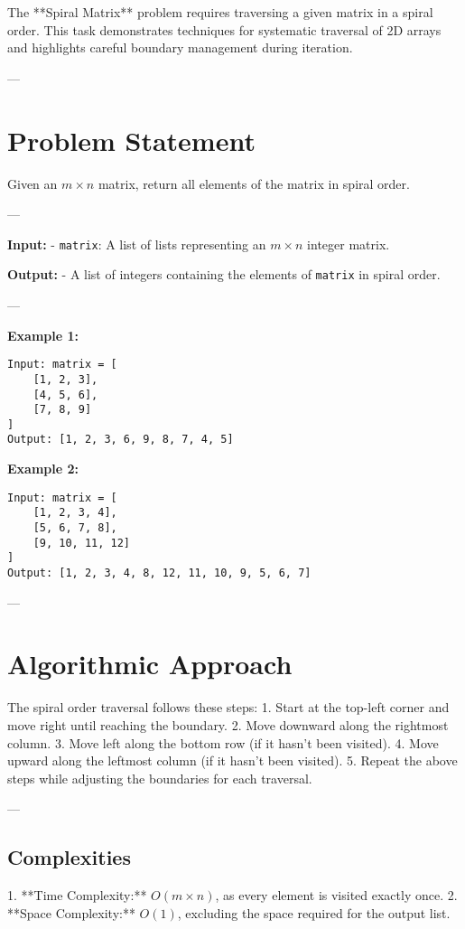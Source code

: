 
\label{problem:Spiral_Matrix}

The **Spiral Matrix** problem requires traversing a given matrix in a spiral order. This task demonstrates techniques for systematic traversal of 2D arrays and highlights careful boundary management during iteration.

---

\section*{Problem Statement}
Given an \(m \times n\) matrix, return all elements of the matrix in spiral order.

---

\textbf{Input:}
- \texttt{matrix}: A list of lists representing an \(m \times n\) integer matrix.

\textbf{Output:}
- A list of integers containing the elements of \texttt{matrix} in spiral order.

---

\textbf{Example 1:}
\begin{verbatim}
Input: matrix = [
    [1, 2, 3],
    [4, 5, 6],
    [7, 8, 9]
]
Output: [1, 2, 3, 6, 9, 8, 7, 4, 5]
\end{verbatim}

\textbf{Example 2:}
\begin{verbatim}
Input: matrix = [
    [1, 2, 3, 4],
    [5, 6, 7, 8],
    [9, 10, 11, 12]
]
Output: [1, 2, 3, 4, 8, 12, 11, 10, 9, 5, 6, 7]
\end{verbatim}

---

\section*{Algorithmic Approach}
The spiral order traversal follows these steps:
1. Start at the top-left corner and move right until reaching the boundary.
2. Move downward along the rightmost column.
3. Move left along the bottom row (if it hasn’t been visited).
4. Move upward along the leftmost column (if it hasn’t been visited).
5. Repeat the above steps while adjusting the boundaries for each traversal.

---

\subsection*{Complexities}
1. **Time Complexity:** \(O(m \times n)\), as every element is visited exactly once.
2. **Space Complexity:** \(O(1)\), excluding the space required for the output list.


